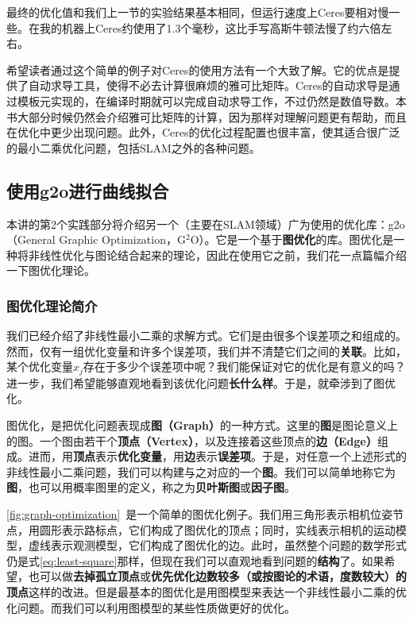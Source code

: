 最终的优化值和我们上一节的实验结果基本相同，但运行速度上Ceres要相对慢一些。在我的机器上Ceres约使用了1.3个毫秒，这比手写高斯牛顿法慢了约六倍左右。

希望读者通过这个简单的例子对Ceres的使用方法有一个大致了解。它的优点是提供了自动求导工具，使得不必去计算很麻烦的雅可比矩阵。Ceres的自动求导是通过模板元实现的，在编译时期就可以完成自动求导工作，不过仍然是数值导数。本书大部分时候仍然会介绍雅可比矩阵的计算，因为那样对理解问题更有帮助，而且在优化中更少出现问题。此外，Ceres的优化过程配置也很丰富，使其适合很广泛的最小二乘优化问题，包括SLAM之外的各种问题。

\subsection{使用g2o进行曲线拟合}
本讲的第2个实践部分将介绍另一个（主要在SLAM领域）广为使用的优化库：g2o（General Graphic Optimization，G$^2$O）。它是一个基于\textbf{图优化}的库。图优化是一种将非线性优化与图论结合起来的理论，因此在使用它之前，我们花一点篇幅介绍一下图优化理论。

\subsubsection{图优化理论简介}
我们已经介绍了非线性最小二乘的求解方式。它们是由很多个误差项之和组成的。然而，仅有一组优化变量和许多个误差项，我们并不清楚它们之间的\textbf{关联}。比如，某个优化变量$x_j$存在于多少个误差项中呢？我们能保证对它的优化是有意义的吗？进一步，我们希望能够直观地看到该优化问题\textbf{长什么样}。于是，就牵涉到了图优化。

图优化，是把优化问题表现成\textbf{图（Graph）}的一种方式。这里的\textbf{图}是图论意义上的图。一个图由若干个\textbf{顶点（Vertex）}，以及连接着这些顶点的\textbf{边（Edge）}组成。进而，用\textbf{顶点}表示\textbf{优化变量}，用\textbf{边}表示\textbf{误差项}。于是，对任意一个上述形式的非线性最小二乘问题，我们可以构建与之对应的一个\textbf{图}。我们可以简单地称它为\textbf{图}，也可以用概率图里的定义，称之为\textbf{贝叶斯图}或\textbf{因子图}。

\autoref{fig:graph-optimization}~是一个简单的图优化例子。我们用三角形表示相机位姿节点，用圆形表示路标点，它们构成了图优化的顶点；同时，实线表示相机的运动模型，虚线表示观测模型，它们构成了图优化的边。此时，虽然整个问题的数学形式仍是式\eqref{eq:least-square}那样，但现在我们可以直观地看到问题的\textbf{结构}了。如果希望，也可以做\textbf{去掉孤立顶点}或\textbf{优先优化边数较多（或按图论的术语，度数较大）的顶点}这样的改进。但是最基本的图优化是用图模型来表达一个非线性最小二乘的优化问题。而我们可以利用图模型的某些性质做更好的优化。

